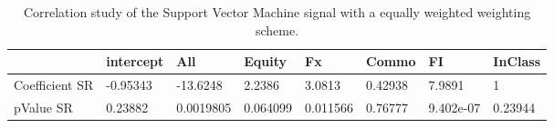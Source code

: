\begin{table}[H]
\centering
\begin{tabular}{llllllll}
& intercept & All & Equity & Fx & Commo & FI & InClass \\ 
\hline 
Coefficient SR & -0.95343 & -13.6248 & 2.2386 & 3.0813 & 0.42938 & 7.9891 & 1 \\ 
pValue SR & 0.23882 & 0.0019805 & 0.064099 & 0.011566 & 0.76777 & 9.402e-07 & 0.23944 \\ 
\hline
\end{tabular}
\caption{Correlation study of the Support Vector Machine signal with a equally weighted weighting scheme.}
\label{SVM_EW_CORR}
\end{table}